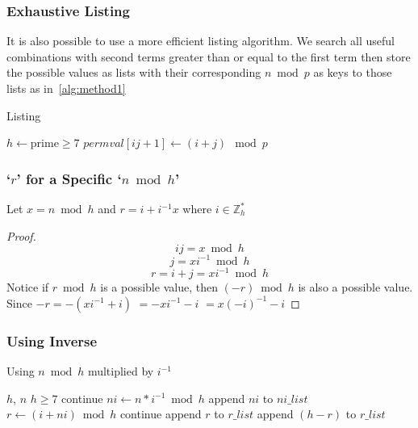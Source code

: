 \documentclass{article}
\begin{document}
{		\subsubsection{Exhaustive Listing}
			It is also possible to use a more efficient listing algorithm.
			We search all useful combinations with second terms greater than or equal to the first term 
			then store the possible values as lists 
			with their corresponding $n \bmod p$ as keys to those lists as in~\ref{alg:method1}
			\begin{algorithm}[H]
				\caption{Listing}
				\label{alg:method1}
				\begin{algorithmic}[1]
					\Require $h \gets \text{prime} \geq 7$
							\State $permval[ij+1] \gets (i+j) \mod p$
						\EndFor
					\EndFor
				\end{algorithmic}
			\end{algorithm}
		\subsubsection{`$r$' for a Specific `$n \bmod h$'}
			Let $x= n \bmod h$ and $r = i + i^{-1} x$ where $i \in \mathbb{Z}_h^*$
			\begin{proof}
				$$ij = x \bmod h$$
				$$j = x i^{-1} \bmod h$$
				$$r = i + j = x i^{-1} \bmod h$$
				Notice if $r \bmod h $ is a possible value, then $(-r) \bmod h$ is also a possible value.
				Since $-r = -( x i^{-1} + i )$
				$= -x i^{-1} - i$ 
				$= x (-i)^{-1} -i$
			\end{proof}
		\subsubsection{Using Inverse}
			\begin{algorithm}
				\caption{Using $n \bmod h$ multiplied by $i^{-1}$}
				\label{alg:method2}
				\begin{algorithmic}[1]
					\Require $h$, $n$
					\Ensure $h \geq 7$
							\State continue
                        \EndIf
                    	\State $ni \gets n * i^{-1} \bmod h$
                        \State append $ni$ to $ni\_list$
						\State $r \gets ( i + ni ) \bmod h$
							\State continue
						\EndIf
						\State append $r$ to $r\_list$
							\State append $(h-r)$ to $r\_list$
						\EndIf
					\EndFor
				\end{algorithmic}
			\end{algorithm}
}
\end{document}

